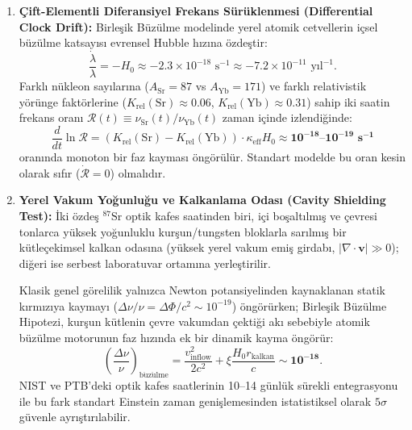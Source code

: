 \begin{enumerate}
    \item \textbf{Çift-Elementli Diferansiyel Frekans Sürüklenmesi (Differential Clock Drift):}
          Birleşik Büzülme modelinde yerel atomik cetvellerin içsel büzülme katsayısı evrensel Hubble hızına özdeştir:
          \begin{equation}
              \frac{\dot{\lambda}}{\lambda} = -H_0 \approx -2.3 \times 10^{-18}\text{ s}^{-1} \approx -7.2 \times 10^{-11}\text{ yıl}^{-1}.
          \end{equation}
          Farklı nükleon sayılarına ($A_{\mathrm{Sr}} = 87$ vs $A_{\mathrm{Yb}} = 171$) ve farklı relativistik yörünge faktörlerine ($K_{\mathrm{rel}}(\mathrm{Sr}) \approx 0.06$, $K_{\mathrm{rel}}(\mathrm{Yb}) \approx 0.31$) sahip iki saatin frekans oranı $\mathcal{R}(t) \equiv \nu_{\mathrm{Sr}}(t) / \nu_{\mathrm{Yb}}(t)$ zaman içinde izlendiğinde:
          \begin{equation}
              \frac{d}{dt} \ln \mathcal{R} = \left( K_{\mathrm{rel}}(\mathrm{Sr}) - K_{\mathrm{rel}}(\mathrm{Yb}) \right) \cdot \kappa_{\mathrm{eff}} H_0 \approx \mathbf{10^{-18}\text{--}10^{-19}\text{ s}^{-1}}
              \label{eq:saat_suruklenme}
          \end{equation}
          oranında monoton bir faz kayması öngörülür. Standart modelde bu oran kesin olarak sıfır ($\dot{\mathcal{R}} = 0$) olmalıdır.
    \item \textbf{Yerel Vakum Yoğunluğu ve Kalkanlama Odası (Cavity Shielding Test):}
          İki özdeş $^{87}\mathrm{Sr}$ optik kafes saatinden biri, içi boşaltılmış ve çevresi tonlarca yüksek yoğunluklu kurşun/tungsten bloklarla sarılmış bir kütleçekimsel kalkan odasına (yüksek yerel vakum emiş girdabı, $|\nabla \cdot \mathbf{v}| \gg 0$); diğeri ise serbest laboratuvar ortamına yerleştirilir.

          Klasik genel görelilik yalnızca Newton potansiyelinden kaynaklanan statik kırmızıya kaymayı ($\Delta \nu / \nu = \Delta \Phi / c^2 \sim 10^{-19}$) öngörürken; Birleşik Büzülme Hipotezi, kurşun kütlenin çevre vakumdan çektiği akı sebebiyle atomik büzülme motorunun faz hızında ek bir dinamik kayma öngörür:
          \begin{equation}
              \left( \frac{\Delta \nu}{\nu} \right)_{\mathrm{b\ddot{u}z\ddot{u}lme}} = \frac{v_{\mathrm{inflow}}^2}{2c^2} + \xi \frac{H_0 r_{\mathrm{kalkan}}}{c} \sim \mathbf{10^{-18}}.
          \end{equation}
          NIST ve PTB'deki optik kafes saatlerinin 10--14 günlük sürekli entegrasyonu ile bu fark standart Einstein zaman genişlemesinden istatistiksel olarak $5\sigma$ güvenle ayrıştırılabilir.
\end{enumerate}

